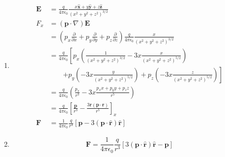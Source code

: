 \documentclass{article}
\renewcommand{\vec}[1]{\boldsymbol{\mathbf{#1}}}
\newcommand{\uvec}[1]{\hat{\vec{#1}}}
\newcommand{\ke}{\frac{1}{4 \pi \epsilon_0}}
\begin{document}
\begin{enumerate}
  \item

        \begin{align*}
          \vec{E} & = \frac{q}{4 \pi \epsilon_0} \frac{x \uvec{x} + y \uvec{y} + z \uvec{z}}{(x^2 + y^2 + z^2)^{3 / 2}}                                                                                 \\
          F_x     & = (\vec{p} \cdot \nabla) \vec{E}                                                                                                                                                    \\
                  & = \left( p_x \frac{\partial}{\partial x} + p_y \frac{\partial}{\partial y} + p_z \frac{\partial}{\partial z} \right) \frac{q}{4 \pi \epsilon_0} \frac{x}{(x^2 + y^2 + z^2)^{3 / 2}} \\
                  & = \frac{q}{4 \pi \epsilon_0} \left[ p_x \left( \frac{1}{(x^2 + y^2 + z^2)^{3 / 2}} - 3 x \frac{x}{(x^2 + y^2 + z^2)^{5 / 2}} \right) \right.                                        \\
                  & \qquad \left. + p_y \left( -3x \frac{y}{(x^2 + y^2 + z^2)^{5 / 2}} \right) + p_z \left( -3 x \frac{z}{(x^2 + y^2 + z^2)^{5 / 2}} \right) \right]                                    \\
                  & = \frac{q}{4 \pi \epsilon_0} \left( \frac{p_x}{r^3} - 3 x \frac{p_x x + p_y y + p_z z}{r^5} \right)                                                                                 \\
                  & = \frac{q}{4 \pi \epsilon_0} \left[ \frac{\vec{p}}{r^3} - \frac{3 \vec{r} (\vec{p} \cdot \vec{r})}{r^5} \right]_x                                                                   \\
          \vec{F} & = \ke \frac{q}{r^3} [\vec{p} - 3 (\vec{p} \cdot \uvec{r}) \uvec{r}]
        \end{align*}

  \item

        \[\vec{F} = \ke \frac{q}{r^3} [3 (\vec{p} \cdot \uvec{r}) \uvec{r} - \vec{p}]\]
\end{enumerate}

\subsection{}
\end{document}
